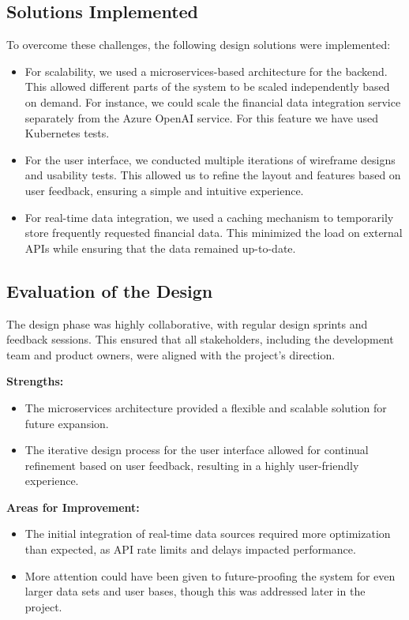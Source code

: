 \documentclass[a4paper,12pt]{report}
\begin{document}
\subsection*{Solutions Implemented}
To overcome these challenges, the following design solutions were implemented:
\begin{itemize}
    \item For scalability, we used a microservices-based architecture for the backend. This allowed different parts of the system to be scaled independently based on demand. For instance, we could scale the financial data integration service separately from the Azure OpenAI service. For this feature we have used Kubernetes tests.
    \item For the user interface, we conducted multiple iterations of wireframe designs and usability tests. This allowed us to refine the layout and features based on user feedback, ensuring a simple and intuitive experience.
    \item For real-time data integration, we used a caching mechanism to temporarily store frequently requested financial data. This minimized the load on external APIs while ensuring that the data remained up-to-date.
\end{itemize}

\subsection*{Evaluation of the Design}
The design phase was highly collaborative, with regular design sprints and feedback sessions. This ensured that all stakeholders, including the development team and product owners, were aligned with the project's direction.

\textbf{Strengths:}
\begin{itemize}
    \item The microservices architecture provided a flexible and scalable solution for future expansion.
    \item The iterative design process for the user interface allowed for continual refinement based on user feedback, resulting in a highly user-friendly experience.
\end{itemize}

\textbf{Areas for Improvement:}
\begin{itemize}
    \item The initial integration of real-time data sources required more optimization than expected, as API rate limits and delays impacted performance.
    \item More attention could have been given to future-proofing the system for even larger data sets and user bases, though this was addressed later in the project.
\end{itemize}
\end{document}
